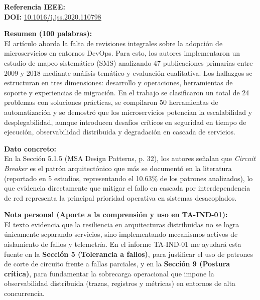 \documentclass[11pt,a4paper]{article}
\begin{document}
\vspace{0.4cm}

\begin{tcolorbox}[colback=white,colframe=black!75!black,title=\textbf{Ficha Bibliográfica 2: Artículo Indexado (Journal of Systems and Software)}]
\textbf{Referencia IEEE:} \cite{ref2_waseem2020sms} \\
\textbf{DOI:} \href{https://doi.org/10.1016/j.jss.2020.110798}{10.1016/j.jss.2020.110798}

\vspace{0.2cm}
\textbf{Resumen (100 palabras):} \\
El artículo aborda la falta de revisiones integrales sobre la adopción de microservicios en entornos DevOps. Para esto, los autores implementaron un estudio de mapeo sistemático (SMS) analizando 47 publicaciones primarias entre 2009 y 2018 mediante análisis temático y evaluación cualitativa. Los hallazgos se estructuran en tres dimensiones: desarrollo y operaciones, herramientas de soporte y experiencias de migración. En el trabajo se clasificaron un total de 24 problemas con soluciones prácticas, se compilaron 50 herramientas de automatización y se demostró que los microservicios potencian la escalabilidad y desplegabilidad, aunque introducen desafíos críticos en seguridad en tiempo de ejecución, observabilidad distribuida y degradación en cascada de servicios.

\vspace{0.2cm}
\textbf{Dato concreto:} \\
En la Sección 5.1.5 (MSA Design Patterns, p. 32), los autores señalan que \textit{Circuit Breaker} es el patrón arquitectónico que más se documentó en la literatura (reportado en 5 estudios, representando el 10.63\% de los patrones analizados), lo que evidencia directamente que mitigar el fallo en cascada por interdependencia de red representa la principal prioridad operativa en sistemas desacoplados.

\vspace{0.2cm}
\textbf{Nota personal (Aporte a la comprensión y uso en TA-IND-01):} \\
El texto evidencia que la resiliencia en arquitecturas distribuidas no se logra únicamente separando servicios, sino implementando mecanismos activos de aislamiento de fallos y telemetría. En el informe TA-IND-01 me ayudará esta fuente en la \textbf{Sección 5 (Tolerancia a fallos)}, para justificar el uso de patrones de corte de circuito frente a fallas parciales, y en la \textbf{Sección 9 (Postura crítica)}, para fundamentar la sobrecarga operacional que impone la observabilidad distribuida (trazas, registros y métricas) en entornos de alta concurrencia.
\end{tcolorbox}
\end{document}

